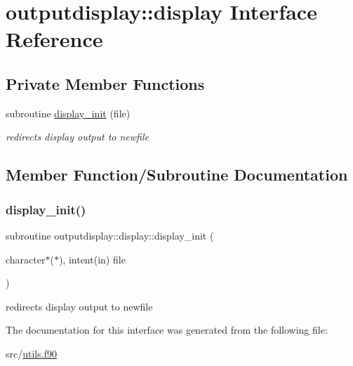 \hypertarget{interfaceoutputdisplay_1_1display}{}\section{outputdisplay\+:\+:display Interface Reference}
\label{interfaceoutputdisplay_1_1display}
\subsection*{Private Member Functions}
\begin{DoxyCompactItemize}
\item 
subroutine \hyperlink{interfaceoutputdisplay_1_1display_a9485418eb16aaf7a4db51a046574d6de}{display\+\_\+init} (file)
\begin{DoxyCompactList}\small\item\em redirects display output to newfile \end{DoxyCompactList}\end{DoxyCompactItemize}


\subsection{Member Function/\+Subroutine Documentation}
\mbox{\label{interfaceoutputdisplay_1_1display_a9485418eb16aaf7a4db51a046574d6de}} 
\subsubsection{\texorpdfstring{display\+\_\+init()}{display\_init()}}
{\footnotesize\ttfamily subroutine outputdisplay\+::display\+::display\+\_\+init (\begin{DoxyParamCaption}\item[{character$\ast$($\ast$), intent(in)}]{file }\end{DoxyParamCaption})\hspace{0.3cm}{\ttfamily [private]}}



redirects display output to newfile 



The documentation for this interface was generated from the following file\+:\begin{DoxyCompactItemize}
\item 
src/\hyperlink{utils_8f90}{utils.\+f90}\end{DoxyCompactItemize}
